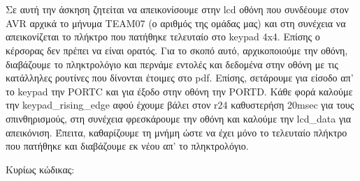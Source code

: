 \section{}
Σε αυτή την άσκηση ζητείται να απεικονίσουμε στην lcd οθόνη που συνδέουμε στον
AVR αρχικά το μήνυμα TEAM07 (ο αριθμός της ομάδας μας) και στη συνέχεια να
απεικονίζεται το πλήκτρο που πατήθηκε τελευταίο στο keypad 4x4. Επίσης ο
κέρσορας δεν πρέπει να είναι ορατός. Για το σκοπό αυτό, αρχικοποιούμε την
οθόνη, διαβάζουμε το πληκτρολόγιο και περνάμε εντολές  και δεδομένα στην οθόνη
με τις κατάλληλες ρουτίνες που δίνονται έτοιμες στο pdf. Επίσης, σετάρουμε για
είσοδο απ' το keypad την PORTC και για έξοδο στην οθόνη την PORTD. Κάθε φορά
καλούμε την keypad\_rising\_edge αφού έχουμε βάλει στον r24 καθυστερήση 20msec
για τους σπινθηρισμούς, στη συνέχεια φρεσκάρουμε την οθόνη και καλούμε την
lcd\_data για απεικόνιση.  Έπειτα, καθαρίζουμε τη μνήμη ώστε να έχει μόνο το
τελευταίο πλήκτρο που πατήθηκε και διαβάζουμε εκ νέου απ' το πληκτρολόγιο.

\noindent Κυρίως κώδικας:
\inputminted[linenos,obeytabs,fontsize=\footnotesize]{c}{files/part4.S}
